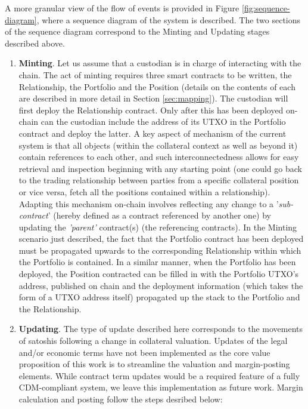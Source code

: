A more granular view of the flow of events is provided in Figure \ref{fig:sequence-diagram}, where a sequence diagram of the system is described. The two sections of the sequence diagram correspond to the Minting and Updating stages described above.

\begin{enumerate}
    \item \textbf{Minting}. Let us assume that a custodian is in charge of interacting with the chain. The act of minting requires three smart contracts to be written, the Relationship, the Portfolio and the Position (details on the contents of each are described in more detail in Section \ref{sec:mapping}). The custodian will first deploy the Relationship contract. Only after this has been deployed on-chain can the custodian include the address of its UTXO in the Portfolio contract and deploy the latter. A key aspect of mechanism of the current system is that all objects (within the collateral context as well as beyond it) contain references to each other, and such interconnectedness allows for easy retrieval and inspection beginning with any starting point (one could go back to the trading relationship between parties from a specific collateral position or vice versa, fetch all the positions contained within a relationship). Adapting this mechanism on-chain involves reflecting any change to a '\textit{sub-contract}' (hereby defined as a contract referenced by another one) by updating the \textit{'parent'} contract(s) (the referencing contracts). In the Minting scenario just described, the fact that the Portfolio contract has been deployed must be propagated upwards to the corresponding Relationship within which the Portfolio is contained. In a similar manner, when the Portfolio has been deployed, the Position contracted can be filled in with the Portfolio UTXO's address, published on chain and the deployment information (which takes the form of a UTXO address itself) propagated up the stack to the Portfolio and the Relationship. \label{minting}
    
    \item \textbf{Updating}. The type of update described here corresponds to the movements of satoshis following a change in collateral valuation. Updates of the legal and/or economic terms have not been implemented as the core value proposition of this work is to streamline the valuation and margin-posting elements. While contract term updates would be a required feature of a fully CDM-compliant system, we leave this implementation as future work. Margin calculation and posting follow the steps desribed below:


\end{enumerate}
